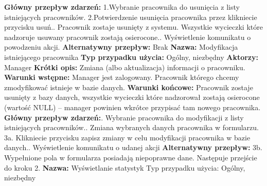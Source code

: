 \documentclass[polish,polish,a4paper]{article}
\begin{document}
\textbf{Główny przepływ zdarzeń:}\newline
1.Wybranie pracownika do usunięcia z listy istniejących pracowników.\newline
2.Potwierdzenie usunięcia pracownika przez klikniecie przycisku usuń.. Pracownik zostaje usunięty z systemu. Wszystkie wycieczki które nadzoruje usuwany pracownik zostają osierocone.. Wyświetlenie komunikatu o powodzeniu akcji.\newline
\textbf{Alternatywny przepływ:}\newline
Brak\newline
\newline
\textbf{Nazwa:} Modyfikacja istniejącego pracownika\newline
\textbf{Typ przypadku użycia:} Ogólny, niezbędny\newline
\textbf{Aktorzy:} Manager\newline
\textbf{Krótki opis:} Zmiana (albo aktualizacja) informacji o pracowniku.\newline
\textbf{Warunki wstępne:} Manager jest zalogowany. Pracownik którego chcemy zmodyfikować istnieje w\newline
bazie danych.\newline
\textbf{Warunki końcowe:} Pracownik zostaje usunięty z bazy danych, wszystkie wycieczki które nadzorował\newline
zostają osierocone (wartość NULL) – manager powinien wkrótce przypisać tam nowego pracownika.\newline
\textbf{Główny przepływ zdarzeń:}. Wybranie pracownika do modyfikacji z listy istniejących pracowników.. Zmiana wybranych danych pracownika w formularzu.\newline
3a. Klikniecie przycisku zapisz zmiany w celu modyfikacji pracownika w bazie danych.. Wyświetlenie komunikatu o udanej akcji\newline
\textbf{Alternatywny przepływ:}\newline
3b. Wypełnione pola w formularza posiadają niepoprawne dane. Następuje przejście do kroku 2.\newline
\newline
\textbf{Nazwa:} Wyświetlanie statystyk\newline
Typ przypadku użycia: Ogólny, niezbędny\newline
\end{document}

